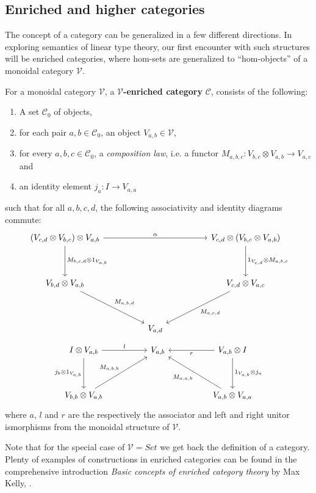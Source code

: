 \subsection{Enriched and higher categories}
The concept of a category can be generalized in a few different directions. In exploring semantics of linear type theory, our first encounter with such structures will be  enriched categories, where hom-sets are generalized to ``hom-objects'' of a monoidal category $\mathcal{V}$.
\begin{defn}\label{enr-cat}
  For a monoidal category $\mathcal{V}$, a \textbf{$\mathcal{V}$-enriched category} $\mathcal{C}$, consists of the following:
  \begin{enumerate}
  \item A set $\mathcal{C}_0$ of objects,
  \item for each pair $a, b \in \mathcal{C}_0$, an object $V_{a,b} \in \mathcal{V}$,
  \item for every $a, b, c \in \mathcal{C}_0$, a \textit{composition law}, i.e. a functor $M_{a, b, c} : V_{b, c} \otimes V_{a, b} \to V_{a, c}$ and
  \item an identity element $j_a : I \to V_{a, a}$
\end{enumerate}
such that for all $a, b, c, d$, the following associativity and identity diagrams commute:
    \[
      \ti
      (V_{c, d} \otimes V_{b, c}) \otimes V_{a, b} \ar[d, "{M_{b, c, d} \otimes 1_{V_{a,b}}}"] \ar[rr, "\alpha"] & & V_{c, d} \otimes (V_{b, c} \otimes V_{a, b}) \ar[d, "{1_{V_{c,d}} \otimes M_{a, b, c}}"]\\
      V_{b, d} \otimes V_{a, b} \ar[rd, "M_{a, b, d}"] & & V_{c, d} \otimes V_{a, c} \ar[ld, "M_{a, c, d}"]\\
      & V_{a, d}      &
      \kz
    \]
    \[
      \ti
      I \otimes V_{a, b} \ar[d, "j_b \otimes 1_{V_{a, b}}", swap] \ar[r, "l"] & V_{a, b} & V_{a, b} \otimes I \ar[l, "r"] \ar[d, "1_{V_{a, b}} \otimes j_a"] \\
      V_{b, b} \otimes V_{a, b} \ar[ru, "M_{a, b, b}"] & & V_{a, b} \otimes V_{a, a} \ar[lu, "M_{a, a, b}"]
      \kz
    \]
    where $a$, $l$ and $r$ are the respectively the associator and left and right unitor ismorphisms from the monoidal structure of $\mathcal{V}$.
\end{defn}
Note that for the special case of $\mathcal{V} = Set$ we get back the definition of a category. Plenty of examples of constructions in enriched categories can be found in the comprehensive introduction \textit{Basic concepts of enriched category theory} by Max Kelly, \cite{kelly}.\\
